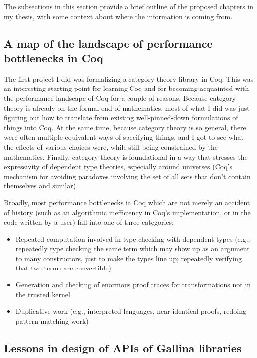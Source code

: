 \documentclass[twoside]{article}
\begin{document}
The subsections in this section provide a brief outline of the proposed chapters in my thesis, with some context about where the information is coming from.

\subsection{A map of the landscape of performance bottlenecks in Coq}

The first project I did was formalizing a category theory library in Coq.
This was an interesting starting point for learning Coq and for becoming acquainted with the performance landscape of Coq for a couple of reasons.
Because category theory is already on the formal end of mathematics, most of what I did was just figuring out how to translate from existing well-pinned-down formulations of things into Coq.
At the same time, because category theory is so general, there were often multiple equivalent ways of specifying things, and I got to see what the effects of various choices were, while still being constrained by the mathematics.
Finally, category theory is foundational in a way that stresses the expressivity of dependent type theories, especially around universes (Coq's mechanism for avoiding paradoxes involving the set of all sets that don't contain themselves and similar).

Broadly, most performance bottlenecks in Coq which are not merely an accident of history (such as an algorithmic inefficiency in Coq's implementation, or in the code written by a user) fall into one of three categories:
\begin{itemize}
\item
  Repeated computation involved in type-checking with dependent types (e.g., repeatedly type checking the same term which may show up as an argument to many constructors, just to make the types line up; repeatedly verifying that two terms are convertible)
\item
  Generation and checking of enormous proof traces for transformations not in the trusted kernel
\item
  Duplicative work (e.g., interpreted languages, near-identical proofs, redoing pattern-matching work)
\end{itemize}


\subsection{Lessons in design of APIs of Gallina libraries}
\end{document}
